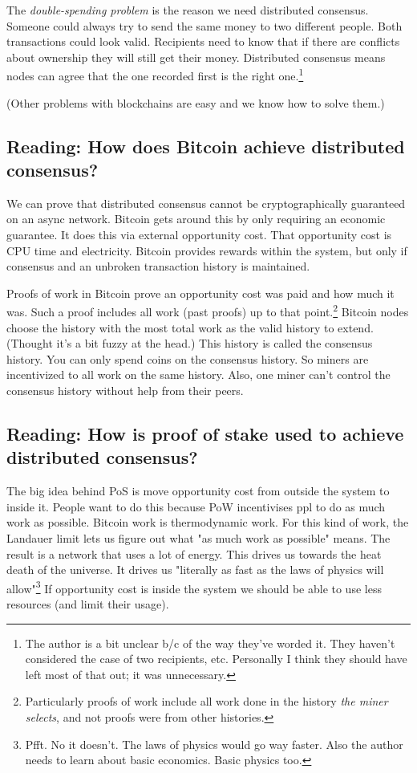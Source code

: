 \documentclass{article}
\begin{document}
The \emph{double-spending problem} is the reason we need distributed consensus. Someone could always try to send the same money to two different people. Both transactions could look valid. Recipients need to know that if there are conflicts about ownership they will still get their money. Distributed consensus means nodes can agree that the one recorded first is the right one.\footnote{The author is a bit unclear b/c of the way they've worded it. They haven't considered the case of two recipients, etc. Personally I think they should have left most of that out; it was unnecessary.}

(Other problems with blockchains are easy and we know how to solve them.)

\subsection{Reading: How does Bitcoin achieve distributed consensus?}

We can prove that distributed consensus cannot be cryptographically guaranteed on an async network. Bitcoin gets around this by only requiring an economic guarantee. It does this via external opportunity cost. That opportunity cost is CPU time and electricity. Bitcoin provides rewards within the system, but only if consensus and an unbroken transaction history is maintained.

Proofs of work in Bitcoin prove an opportunity cost was paid and how much it was. Such a proof includes all work (past proofs) up to that point.\footnote{Particularly proofs of work include all work done in the history \emph{the miner selects}, and not proofs were from other histories.} Bitcoin nodes choose the history with the most total work as the valid history to extend. (Thought it's a bit fuzzy at the head.) This history is called the consensus history. You can only spend coins on the consensus history. So miners are incentivized to all work on the same history. Also, one miner can't control the consensus history without help from their peers.

\subsection{Reading: How is proof of stake used to achieve distributed consensus?}

The big idea behind PoS is move opportunity cost from outside the system to inside it. People want to do this because PoW incentivises ppl to do as much work as possible. Bitcoin work is thermodynamic work. For this kind of work, the Landauer limit lets us figure out what "as much work as possible" means. The result is a network that uses a lot of energy. This drives us towards the heat death of the universe. It drives us "literally as fast as the laws of physics will allow"\footnote{Pfft. No it doesn't. The laws of physics would go way faster. Also the author needs to learn about basic economics. Basic physics too.} If opportunity cost is inside the system we should be able to use less resources (and limit their usage).
\end{document}

